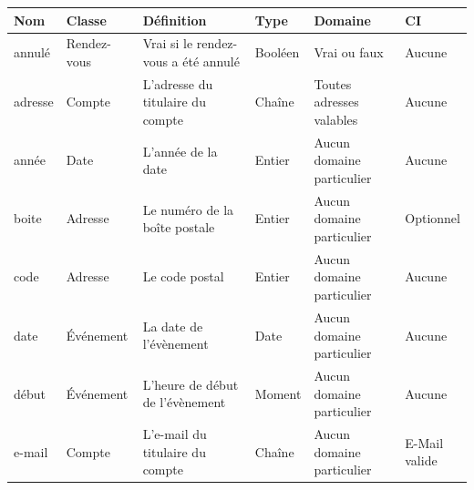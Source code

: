 \documentclass[a4paper, 11pt]{report}
\begin{document}
\begin{center}
\begin{longtable}{|p{2cm}|p{2cm}|p{3cm}|p{2cm}|p{2cm}|p{2cm}|}
		\hline
		Nom & Classe & Définition & Type & Domaine & CI \\
		\hline
		annulé & Rendez-vous & \parbox[t]{3cm}{Vrai si le rendez-vous a été annulé\\} &
        Booléen & Vrai ou faux & Aucune \\
		\hline
        adresse & Compte & \parbox[t]{3cm}{L'adresse du titulaire du compte\\} & Chaîne 
        & \parbox[t]{2cm}{Toutes adresses valables\\} & Aucune \\
        \hline
        année & Date & L'année de la date & Entier & \parbox[t]{2cm}{Aucun\\ domaine particulier\\} & Aucune \\
        \hline
        boite & Adresse & \parbox[t]{3cm}{Le numéro de la boîte postale\\} & Entier & \parbox[t]{2cm}{Aucun\\ domaine particulier\\} &
        Optionnel \\
        \hline
        code & Adresse & \parbox[t]{3cm}{Le code postal\\} & Entier & \parbox[t]{2cm}{Aucun\\ domaine particulier\\} & Aucune \\
        \hline
        date & Événement & \parbox[t]{3cm}{La date de l'évènement\\} & Date & \parbox[t]{2cm}{Aucun\\ domaine particulier\\} &
        Aucune \\
        \hline
        début & Événement & \parbox[t]{3cm}{L'heure de début de l'évènement\\} & Moment & \parbox[t]{2cm}{Aucun\\ domaine particulier\\} &
        Aucune \\
        \hline
        e-mail & Compte & \parbox[t]{3cm}{L'e-mail du titulaire du compte\\} & Chaîne & \parbox[t]{2cm}{Aucun\\ domaine particulier\\}
        & \parbox[t]{2cm}{E-Mail\\ valide} \\

\end{longtable}
\end{center}
\end{document}
